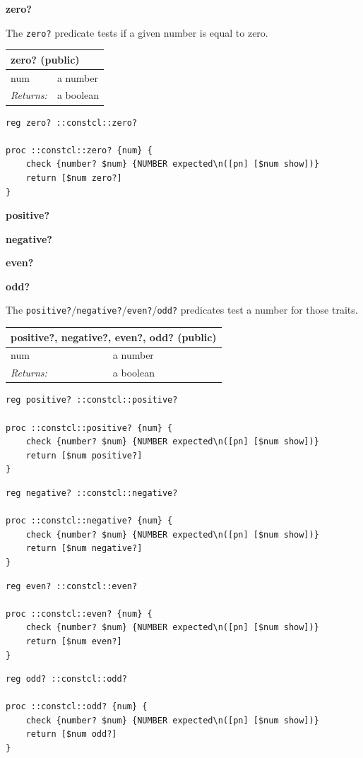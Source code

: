 \documentclass[twoside,9pt]{report}
\begin{document}
\textbf{zero?}


The \texttt{zero?} predicate tests if a given number is equal to zero.

\begin{tabular}{ |l l| }
\hline
\multicolumn{2}{|l|}{zero? (public)} \\
\hline
num & a number \\
\textit{Returns:} & a boolean \\
\hline
\end{tabular}

\noindent\makebox[\linewidth]{\rule{\linewidth}{0.4pt}}
\begin{lstlisting}
reg zero? ::constcl::zero?
 
proc ::constcl::zero? {num} {
    check {number? $num} {NUMBER expected\n([pn] [$num show])}
    return [$num zero?]
}
\end{lstlisting}
\noindent\makebox[\linewidth]{\rule{\linewidth}{0.4pt}}

\textbf{positive?}


\textbf{negative?}


\textbf{even?}


\textbf{odd?}


The \texttt{positive?}/\texttt{negative?}/\texttt{even?}/\texttt{odd?} predicates test a number for those traits.

\begin{tabular}{ |l l| }
\hline
\multicolumn{2}{|l|}{positive?, negative?, even?, odd? (public)} \\
\hline
num & a number \\
\textit{Returns:} & a boolean \\
\hline
\end{tabular}

\noindent\makebox[\linewidth]{\rule{\linewidth}{0.4pt}}
\begin{lstlisting}
reg positive? ::constcl::positive?
 
proc ::constcl::positive? {num} {
    check {number? $num} {NUMBER expected\n([pn] [$num show])}
    return [$num positive?]
}
\end{lstlisting}
\noindent\makebox[\linewidth]{\rule{\linewidth}{0.4pt}}
\noindent\makebox[\linewidth]{\rule{\linewidth}{0.4pt}}
\begin{lstlisting}
reg negative? ::constcl::negative?
 
proc ::constcl::negative? {num} {
    check {number? $num} {NUMBER expected\n([pn] [$num show])}
    return [$num negative?]
}
\end{lstlisting}
\noindent\makebox[\linewidth]{\rule{\linewidth}{0.4pt}}
\noindent\makebox[\linewidth]{\rule{\linewidth}{0.4pt}}
\begin{lstlisting}
reg even? ::constcl::even?
 
proc ::constcl::even? {num} {
    check {number? $num} {NUMBER expected\n([pn] [$num show])}
    return [$num even?]
}
\end{lstlisting}
\noindent\makebox[\linewidth]{\rule{\linewidth}{0.4pt}}
\noindent\makebox[\linewidth]{\rule{\linewidth}{0.4pt}}
\begin{lstlisting}
reg odd? ::constcl::odd?
 
proc ::constcl::odd? {num} {
    check {number? $num} {NUMBER expected\n([pn] [$num show])}
    return [$num odd?]
}
\end{lstlisting}
\noindent\makebox[\linewidth]{\rule{\linewidth}{0.4pt}}
\end{document}
